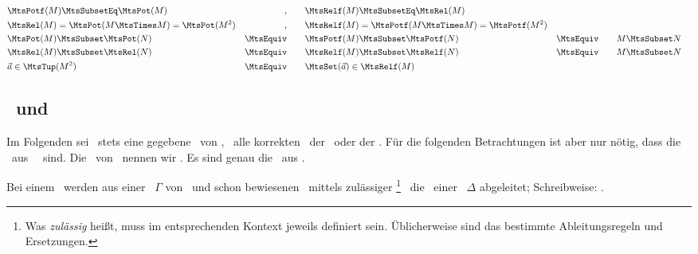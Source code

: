 \begin{align}
	& \MtsPotf(M) \MtsSubsetEq \MtsPot          (M)
	& ,          \qquad
	& \MtsRelf(M) \MtsSubsetEq \MtsRel          (M)
	\label{eq:Setf} \\
	& \MtsRel (M) =            \MtsPot (M \MtsTimes M)=\MtsPot (M^2)
	& ,          \qquad
	& \MtsRelf(M) =            \MtsPotf(M \MtsTimes M)=\MtsPotf(M^2)
	\label{eq:relPot} \\
	& \MtsPot (M) \MtsSubset   \MtsPot          (N)
	& \MtsEquiv \qquad
	& \MtsPotf(M) \MtsSubset   \MtsPotf         (N)
	& \MtsEquiv \qquad
	&               M  \MtsSubset                          N
	\label{eq:potPot} \\
	& \MtsRel (M) \MtsSubset   \MtsRel          (N)
	& \MtsEquiv \qquad
	& \MtsRelf(M) \MtsSubset   \MtsRelf         (N)
	& \MtsEquiv \qquad
	&               M  \MtsSubset                          N
	\label{eq:relRel} \\
	&                                 \vec{a}  \in \MtsTup(M^2)
	& \MtsEquiv \qquad  & \MtsSet(\vec{a}) \in \MtsRelf    (M)
	\label{eq:vecrel}
\end{align}

\subsection[Formeln und Ableitungen]{\Formeln\ und \Ableitungen}%
\label             {sub:Ableitungen}

Im Folgenden sei \MtsSprache\ stets eine gegebene \Menge\ von \Formeln, \textzB\ alle korrekten \Formeln\ der \Aussagenlogik\ oder der \Praedikatenlogik.
Für die folgenden Betrachtungen ist aber nur nötig, dass die \Elemente\ aus \MtsSprache\ \Symbolfolgen\ sind.
Die \Teilmengen\ von \MtsSprache\ nennen wir .
Es sind genau die \Elemente\ aus \MtsPotSprache.

Bei einem \Beweis\ werden aus einer \Formelmenge\ $\Gamma$ von \Axiomen\ und schon bewiesenen \Formeln\ mittels zulässiger
\footnote{%
	Was \emph{zulässig} heißt, muss im entsprechenden Kontext jeweils definiert sein.
	Üblicherweise sind das bestimmte Ableitungsregeln und Ersetzungen.
}
\Ableitungen\ die \Formeln\ einer \Formelmenge\ $\Delta$ abgeleitet; Schreibweise: \seqqt{$\Gamma \MtsDerive \Delta$}.

